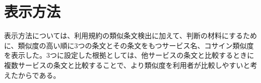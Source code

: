 \section{表示方法}
表示方法については、利用規約の類似条文検出に加えて、判断の材料にするために、類似度の高い順に3つの条文とその条文をもつサービス名、コサイン類似度を表示した。3つに設定した根拠としては、他サービスの条文と比較するときに複数サービスの条文と比較することで、より類似度を利用者が比較しやすいと考えたからである。


